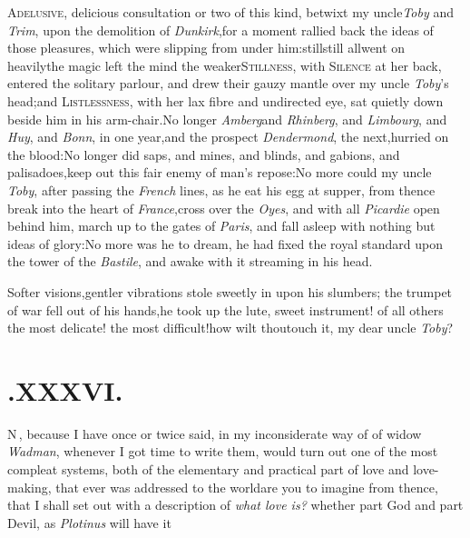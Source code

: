 \documentclass{article}
\begin{document}
\lettrine{A}{delusive}, delicious consultation or
two of this kind, betwixt my uncle\break \textit{Toby} and \textit{Trim},
upon the demolition of \textit{Dunkirk},\tsk for a moment rallied
back the ideas of those pleasures, which were slipping from under
him:\tsk still\tsk still all\break went on
heavily\tsh the magic left the mind the
weaker\tsk \textsc{Stillness}, with \textsc{Silence}
at her back, entered the solitary parlour, and drew their gauzy
mantle over my uncle \textit{Toby}’s head;\tsk\!\tsk and\break
\textsc{Listlessness}, with her lax fibre and un\-directed eye,
sat quietly down beside him in his arm-chair.\tsh No longer
\textit{Amberg}\break and \textit{Rhinberg}, and \textit{Limbourg}, and
\textit{Huy}, and \textit{Bonn}, in one year,\tsk and the prospect
\break
\textit{Dendermond}, the next,\tsk hurried on the blood:\tsk No
longer did saps, and mines, and blinds, and gabions, and
palisadoes,\pb keep out this fair enemy of man’s
repose:\tsh No more could my uncle \textit{Toby}, after
passing the \textit{French} lines, as he eat his egg at supper, from
thence break into the heart of \textit{France},\tsk cross over the
\textit{Oyes}, and with all \textit{Picardie} open behind him, march up
to the gates of \textit{Paris}, and fall asleep with nothing but
ideas of glory:\tsh No more was he to dream, he had fixed
the royal standard upon the tower of the \textit{Bastile}, and awake
with it streaming in his head.

\tsh Softer visions,\tsk gentler vibrations stole
sweetly in upon his slumbers;\break
\tsk the trumpet of war fell out of
his hands,\tsk he took up the lute, sweet instrument! of all
others the most delicate! the most difficult!\tsh how wilt
thou\break touch it, my dear uncle \textit{Toby}?

\newpage\null\smallskip
\section{.\enspace XXXVI.}

\lettrine{N}{\,}, because I have once or twice
said, in my inconsiderate way of \break
{}
of
widow \textit{Wadman}, whenever I got time to write them, would turn
out one of the most compleat systems, both of the elementary and
practical part of love and love-making, that ever was addressed to
the world\tsh are you to imagine from thence, that I shall
set out with a description of \textit{what love is?} whether part God
and part Devil, as \textit{Plotinus} will have\break
it\tsh
\end{document}
